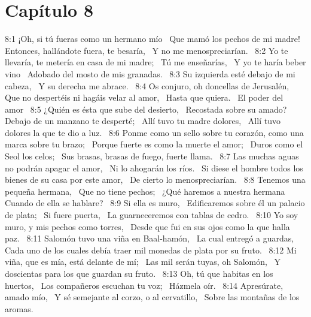 \section*{Capítulo 8 }

8:1 ¡Oh, si tú fueras como un hermano mío  
Que mamó los pechos de mi madre!  
Entonces, hallándote fuera, te besaría,  
Y no me menospreciarían.  
8:2 Yo te llevaría, te metería en casa de mi madre;  
Tú me enseñarías,  
Y yo te haría beber vino  
Adobado del mosto de mis granadas.  
8:3 Su izquierda esté debajo de mi cabeza,  
Y su derecha me abrace.  
8:4 Os conjuro, oh doncellas de Jerusalén,  
Que no despertéis ni hagáis velar al amor,  
Hasta que quiera.  
El poder del amor  
8:5 ¿Quién es ésta que sube del desierto,  
Recostada sobre su amado?  
Debajo de un manzano te desperté;  
Allí tuvo tu madre dolores,  
Allí tuvo dolores la que te dio a luz.  
8:6 Ponme como un sello sobre tu corazón, como una marca sobre tu brazo;  
Porque fuerte es como la muerte el amor;  
Duros como el Seol los celos;  
Sus brasas, brasas de fuego, fuerte llama.  
8:7 Las muchas aguas no podrán apagar el amor,  
Ni lo ahogarán los ríos.  
Si diese el hombre todos los bienes de su casa por este amor,  
De cierto lo menospreciarían.  
8:8 Tenemos una pequeña hermana,  
Que no tiene pechos;  
¿Qué haremos a nuestra hermana  
Cuando de ella se hablare?  
8:9 Si ella es muro,  
Edificaremos sobre él un palacio de plata;  
Si fuere puerta,  
La guarneceremos con tablas de cedro.  
8:10 Yo soy muro, y mis pechos como torres,  
Desde que fui en sus ojos como la que halla paz.  
8:11 Salomón tuvo una viña en Baal-hamón,  
La cual entregó a guardas,  
Cada uno de los cuales debía traer mil monedas de plata por su fruto.  
8:12 Mi viña, que es mía, está delante de mí;  
Las mil serán tuyas, oh Salomón,  
Y doscientas para los que guardan su fruto.  
8:13 Oh, tú que habitas en los huertos,  
Los compañeros escuchan tu voz;  
Házmela oír.  
8:14 Apresúrate, amado mío,  
Y sé semejante al corzo, o al cervatillo,  
Sobre las montañas de los aromas.
